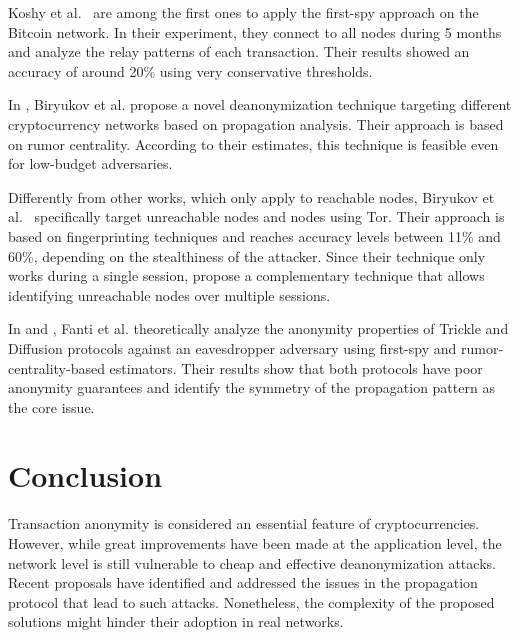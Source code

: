 \documentclass{article}
\begin{document}
	Koshy et al.~\cite{koshy2014analysis} are among the first ones to apply the first-spy approach on the Bitcoin network. 
	In their experiment, they connect to all nodes during 5 months and analyze the relay patterns of each transaction. 
	Their results showed an accuracy of around 20\% using very conservative thresholds.
	
	In \cite{biryukov2019deanonymization}, Biryukov et al. propose a novel deanonymization technique targeting different cryptocurrency networks based on propagation analysis.
	Their approach is based on rumor centrality.
	According to their estimates, this technique is feasible even for low-budget adversaries.
	
	Differently from other works, which only apply to reachable nodes, Biryukov et al.~\cite{biryukov2014deanonymisation, biryukov2015tor} specifically target unreachable nodes and nodes using Tor. Their approach is based on fingerprinting techniques and reaches accuracy levels between 11\% and 60\%, depending on the stealthiness of the attacker.
	Since their technique only works during a single session, \cite{mastan2018new} propose a complementary technique that allows identifying unreachable nodes over multiple sessions.
	
	In \cite{fanti2017anonymity} and \cite{fanti2017deanonimization}, Fanti et al. theoretically analyze the anonymity properties of Trickle and Diffusion protocols against an eavesdropper adversary using first-spy and rumor-centrality-based estimators.
	Their results show that both protocols have poor anonymity guarantees and identify the symmetry of the propagation pattern as the core issue.
	
	
	\section{Conclusion}
	Transaction anonymity is considered an essential feature of cryptocurrencies.
	However, while great improvements have been made at the application level, the network level is still vulnerable to cheap and effective deanonymization attacks.
	Recent proposals have identified and addressed the issues in the propagation protocol that lead to such attacks.
	Nonetheless, the complexity of the proposed solutions might hinder their adoption in real networks.
	
\end{document}
